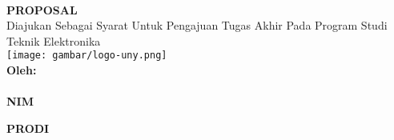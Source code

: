 

\begin{titlepage}
    \begin{center}

        \begin{doublespace}
            \textbf{\Large{\MakeUppercase{\judulid}}}\\[2cm]
        \end{doublespace}
        \textbf{\MakeUppercase{\large{Proposal \tipe}}}\\[0.5cm]

        Diajukan Sebagai Syarat Untuk Pengajuan Tugas Akhir Pada Program Studi Teknik Elektronika {\fakultas} {\universitas}\\[1.5cm]

        \texttt{[image: gambar/logo-uny.png]}\\[1.5cm]

        \textbf{Oleh:} \\
        \textbf{\MakeUppercase{{\penulis}}} \\
        \textbf{NIM} \textbf{{\nim}}\\[2cm]

        \vfill

        \textbf{\large \MakeUppercase{Prodi \prodi}}\\
        \textbf{\large \MakeUppercase{\fakultas}}\\
        \textbf{\large \MakeUppercase{\universitas}}\\
        \textbf{\large \the\year{}}\\
    \end{center}
\end{titlepage}

